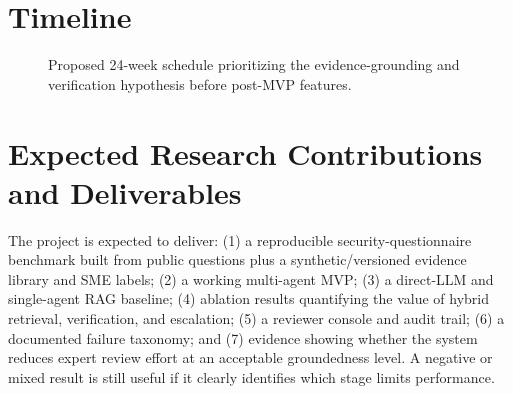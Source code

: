 \documentclass[11pt,journal,onecolumn]{IEEEtran}
\begin{document}
\section{Timeline}
\label{sec:timeline}
\begin{figure}[H]
\centering
{}
\caption{Proposed 24-week schedule prioritizing the evidence-grounding and verification hypothesis before post-MVP features.}
\label{fig:gantt}
\end{figure}

\section{Expected Research Contributions and Deliverables}
The project is expected to deliver: (1) a reproducible security-questionnaire benchmark built from public questions plus a synthetic/versioned evidence library and SME labels; (2) a working multi-agent MVP; (3) a direct-LLM and single-agent RAG baseline; (4) ablation results quantifying the value of hybrid retrieval, verification, and escalation; (5) a reviewer console and audit trail; (6) a documented failure taxonomy; and (7) evidence showing whether the system reduces expert review effort at an acceptable groundedness level. A negative or mixed result is still useful if it clearly identifies which stage limits performance.
\end{document}
